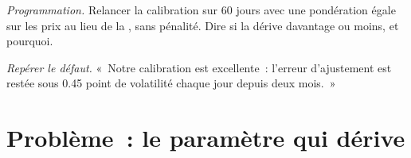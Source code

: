 \begin{exercise}[$\star\star\star$]\label{exo:dv:fourier-pricing-and-calibration-engineering:7}
\emph{Programmation.} Relancer la calibration sur 60 jours avec une pondération égale sur les prix au lieu de la , sans pénalité. Dire si la  dérive davantage ou moins, et pourquoi.
\end{exercise}

\begin{exercise}[$\star\star\star$]\label{exo:dv:fourier-pricing-and-calibration-engineering:8}
\emph{Repérer le défaut.} «~Notre calibration est excellente~: l'erreur d'ajustement est restée sous 0.45 point de volatilité chaque jour depuis deux mois.~»
\end{exercise}

\section{Problème~: le paramètre qui dérive}

